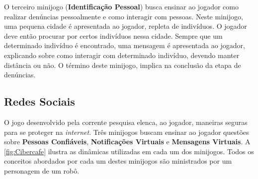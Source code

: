 O terceiro minijogo (\textbf{Identificação Pessoal}) busca ensinar ao jogador como realizar denúncias pessoalmente e como interagir com pessoas. Neste minijogo, uma pequena cidade é apresentada ao jogador, repleta de indivíduos. O jogador deve então procurar por certos indivíduos nessa cidade. Sempre que um determinado indivíduo é encontrado, uma mensagem é apresentada ao jogador, explicando sobre como interagir com determinado indivíduo, devendo manter distância ou não. O término deste minijogo, implica na conclusão da etapa de denúncias. 


\subsection{Redes Sociais}\label{subsec:4}

O jogo desenvolvido pela corrente pesquisa elenca, ao jogador, maneiras seguras para se proteger na \textit{internet}. Três minijogos buscam ensinar ao jogador questões sobre \textbf{Pessoas Confiáveis}, \textbf{Notificações Virtuais} e \textbf{Mensagens Virtuais}. A \autoref{fig:Cibercafe} ilustra as dinâmicas utilizadas em cada um dos minijogos. Todos os conceitos abordados por cada um destes minijogos são ministrados por um personagem de um robô. 

